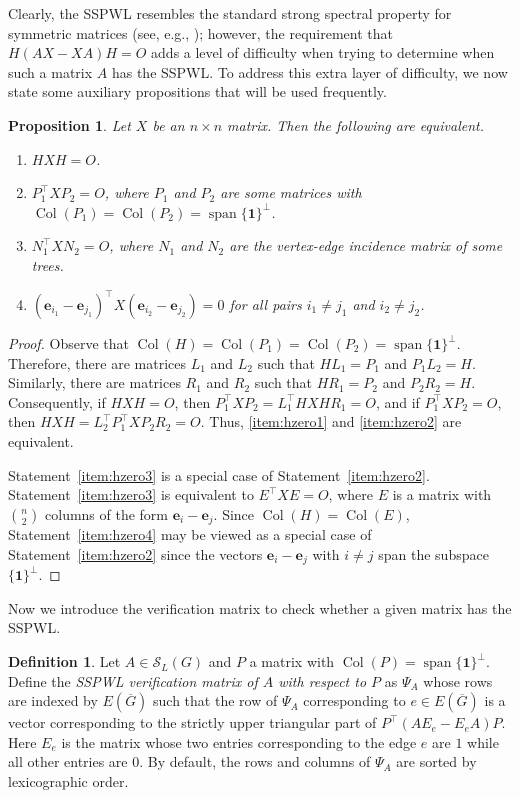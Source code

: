 \documentclass{article}
\newtheorem{proposition}[theorem]{Proposition}
\theoremstyle{definition}
\newtheorem{definition}[theorem]{Definition}
\newcommand{\trans}{^\top}
\newcommand{\bone}{\mathbf{1}}
\newcommand{\be}{\mathbf{e}}
\newcommand{\Col}{\operatorname{Col}}
\newcommand{\vspan}{\operatorname{span}}
\newcommand{\mptn}{\mathcal{S}}
\begin{document}
Clearly, the SSPWL resembles the standard strong spectral property for symmetric matrices (see, e.g., \cite{IEPG2, gSAP}); however, the requirement that $H(AX - XA)H = O$ adds a level of difficulty when trying to determine when such a matrix $A$ has the SSPWL. To address this extra layer of difficulty, we now state some auxiliary propositions that will be used frequently.

\begin{proposition}
\label{prop:hzero}
Let $X$ be an $n\times n$ matrix.  Then the following are equivalent.
\begin{enumerate}[label={\rm(\arabic*)}]
\item $HXH = O$. \label{item:hzero1}
\item $P_1\trans XP_2 = O$, where $P_1$ and $P_2$ are some matrices with $\Col(P_1) = \Col(P_2) = \vspan\{\bone\}^\perp$. \label{item:hzero2}
\item $N_1\trans XN_2 = O$, where $N_1$ and $N_2$ are the vertex-edge incidence matrix of some trees. \label{item:hzero3}
\item $(\be_{i_1} - \be_{j_1})\trans X (\be_{i_2} - \be_{j_2}) = 0$ for all pairs $i_1 \neq j_1$ and $i_2 \neq j_2$. \label{item:hzero4}
\end{enumerate}
\end{proposition}
\begin{proof}
Observe that $\Col(H) = \Col(P_1) = \Col(P_2) = \vspan\{\bone\}^\perp$.  Therefore, there are matrices $L_1$ and $L_2$ such that $HL_1 = P_1$ and $P_1L_2 = H$.  Similarly, there are matrices $R_1$ and $R_2$ such that $HR_1 = P_2$ and $P_2R_2 = H$.  Consequently, if $HXH = O$, then $P_1\trans XP_2 = L_1\trans HXHR_1 = O$, and if $P_1\trans XP_2 = O$, then $HXH = L_2\trans P_1\trans XP_2R_2 = O$.  Thus, \ref{item:hzero1} and \ref{item:hzero2} are equivalent.  

Statement~\ref{item:hzero3} is a special case of Statement~\ref{item:hzero2}. 
Statement~\ref{item:hzero3} is equivalent to $E\trans XE = O$, where $E$ is a matrix with $\binom{n}{2}$ columns of the form $\be_i - \be_j$.  Since $\Col(H) = \Col(E)$, Statement~\ref{item:hzero4} may be viewed as a special case of Statement~\ref{item:hzero2} since the vectors $\be_{i} - \be_{j}$ with $i\neq j$ span the subspace $\{\bone\}^\perp$.
\end{proof}

Now we introduce the verification matrix to check whether a given matrix has the SSPWL.  

\begin{definition}
\label{def:verification}
Let $A\in\mptn_L(G)$ and $P$ a matrix with $\Col(P) = \vspan\{\bone\}^\perp$.  Define the \emph{SSPWL verification matrix of $A$ with respect to $P$} as $\Psi_A$ whose rows are indexed by $E(\overline{G})$ such that the row of $\Psi_A$ corresponding to $e\in E(\overline{G})$ is a vector corresponding to the strictly upper triangular part of $P\trans(AE_e - E_eA)P$.  Here $E_e$ is the matrix whose two entries corresponding to the edge $e$ are $1$ while all other entries are $0$.  By default, the rows and columns of $\Psi_A$ are sorted by lexicographic order.   
\end{definition}
\end{document}
